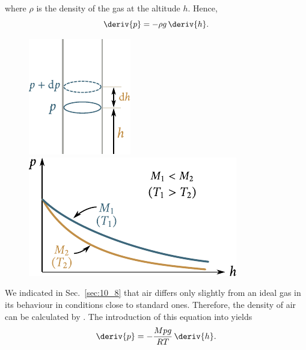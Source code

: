 \noindent
where $\rho$ is the density of the gas at the altitude $h$. Hence,
\begin{equation}\label{eq:10_68}
	\deriv{p} = -\rho g\,\deriv{h}.
\end{equation}

\begin{figure}[!htb]
	\begin{minipage}[t]{0.4\linewidth}
		\begin{center}
			\includegraphics[scale=1.0]{figures/ch_10/fig_10_7.pdf}
			\caption[]{}
			\label{fig:10_7}
		\end{center}
	\end{minipage}
	\hspace{-0.05cm}
	\begin{minipage}[t]{0.5\linewidth}
		\begin{center}
			\includegraphics[scale=1.0]{figures/ch_10/fig_10_8.pdf}
			\caption[]{}
			\label{fig:10_8}
		\end{center}
	\end{minipage}
\end{figure}

We indicated in Sec.~\ref{sec:10_8} that air differs only slightly from an ideal gas in its behaviour in conditions close to standard ones. Therefore, the density of air can be calculated by . The introduction of this equation into  yields
\begin{equation}\label{eq:10_69}
	\deriv{p} = -\frac{Mpg}{RT}\,\deriv{h}.
\end{equation}

